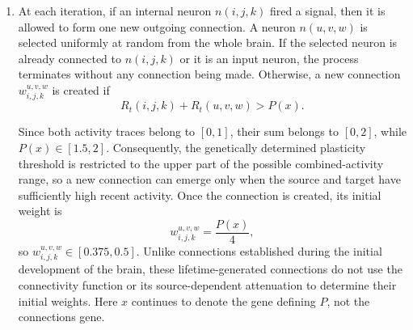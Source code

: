 \documentclass[12pt,a4paper]{article}
\begin{document}
\begin{enumerate}
	Since the saturation function is
	$$\sigma(s)=1-e^{-s/\kappa},$$
the neuronal states corresponding to these two signal levels are
	$$s_L=\sigma^{-1}(L)=-\kappa\ln(1-L), \qquad
	s_H=\sigma^{-1}(H)=-\kappa\ln(1-H).$$

	For each non-input neuron, let $s$ denote its current state and let $R_t$ denote its current activity trace. The homeostatically corrected state is defined by
	$$
	s \leftarrow
	\left\{
	\begin{array}{ll}
	\displaystyle
	s+\frac{L-R_t}{L}(s_L-s),
	& R_t<L \text{ and } s<s_L, \\[10pt]
	\displaystyle
	s-\frac{R_t-H}{1-H}(s-s_H),
	& R_t>H \text{ and } s>s_H, \\[10pt]
	s,
	& \text{otherwise}.
	\end{array}
	\right.
	$$

	Thus, the mechanism is inactive for $L \leq R_t \leq H$. As $R_t$ approaches either extreme, the correction increases continuously: low-activity states are moved toward $s_L$, while excessively high states are moved toward $s_H$. No additional genetically determined parameter is introduced, since the state scale follows directly from the exponential factor $\kappa$ through the inverse saturation function.
	
	\item At each iteration, if an internal neuron $n(i,j,k)$ fired a signal, then it is allowed to form one new outgoing connection. A neuron $n(u,v,w)$ is selected uniformly at random from the whole brain. If the selected neuron is already connected to $n(i,j,k)$ or it is an input neuron, the process terminates without any connection being made. Otherwise, a new connection $w_{i,j,k}^{u,v,w}$ is created if
	$$R_t(i,j,k) + R_t(u,v,w) > P(x).$$

	Since both activity traces belong to $[0,1]$, their sum belongs to $[0,2]$, while $P(x)\in[1.5,2]$. Consequently, the genetically determined plasticity threshold is restricted to the upper part of the possible combined-activity range, so a new connection can emerge only when the source and target have sufficiently high recent activity. Once the connection is created, its initial weight is
	$$w_{i,j,k}^{u,v,w} = \frac{P(x)}{4},$$
so $w_{i,j,k}^{u,v,w}\in[0.375,0.5]$. Unlike connections established during the initial development of the brain, these lifetime-generated connections do not use the connectivity function or its source-dependent attenuation to determine their initial weights. Here $x$ continues to denote the gene defining $P$, not the connections gene.


\end{enumerate}
\end{document}
